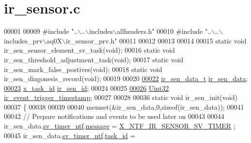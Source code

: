 \hypertarget{a00045_source}{\section{ir\+\_\+sensor.\+c}
\label{a00045_source}
}

\begin{DoxyCode}
00001 
00009 \textcolor{preprocessor}{#include "..\(\backslash\)..\(\backslash\)includes\(\backslash\)allheaders.h"} 
00010 \textcolor{preprocessor}{#include "..\(\backslash\)..\(\backslash\)includes\_prv\(\backslash\)aq0X\(\backslash\)ir\_sensor\_prv.h"}
00011 
00012 
00013 
00014 
00015 \textcolor{keyword}{static} \textcolor{keywordtype}{void}             ir\_sen\_sensor\_element\_sv\_task(\textcolor{keywordtype}{void});
00016 \textcolor{keyword}{static} \textcolor{keywordtype}{void}             ir\_sen\_threshold\_adjustment\_task(\textcolor{keywordtype}{void});
00017 \textcolor{keyword}{static} \textcolor{keywordtype}{void}             ir\_sen\_mark\_false\_postives(\textcolor{keywordtype}{void});
00018 \textcolor{keyword}{static} \textcolor{keywordtype}{void}             ir\_sen\_diagonesis\_record(\textcolor{keywordtype}{void});
00019 
00020 
\hypertarget{a00045_source_l00022}{}\hyperlink{a00045_a73dfacb46242746440accc76c7ef710d}{00022} \hyperlink{a00023_d6/d21/a00573}{ir\_sen\_data\_t} \hyperlink{a00045_a73dfacb46242746440accc76c7ef710d}{ir\_sen\_data};
\hypertarget{a00045_source_l00023}{}\hyperlink{a00045_a624782f67b3870f0dde83528770ef5fc}{00023} \hyperlink{a00036_ad5c3c5fbfd3e4aadf22830395484a71d}{x\_task\_id}        \hyperlink{a00045_a624782f67b3870f0dde83528770ef5fc}{ir\_sen\_id};
00024 
00025 
\hypertarget{a00045_source_l00026}{}\hyperlink{a00045_a6951f534a479b17c02d7da3ad6489634}{00026} \hyperlink{a00072_aba99025e657f892beb7ff31cecf64653}{Uint32}           \hyperlink{a00045_a6951f534a479b17c02d7da3ad6489634}{ir\_event\_trigger\_timestamp};
00027 
00028 
00036  \textcolor{keyword}{static} \textcolor{keywordtype}{void} ir\_sen\_init(\textcolor{keywordtype}{void})
00037 \{
00038 
00039 
00040     memset(&ir\_sen\_data,0,\textcolor{keyword}{sizeof}(ir\_sen\_data));
00041 
00042     \textcolor{comment}{// Prepare notifications and events to be used later on}
00043 
00044     ir\_sen\_data.\hyperlink{a00023_ada91b200053f2d93e3639dc4ee3415b4}{sv\_timer\_ntf}.\hyperlink{a00036_adf9665938515a20c283eea2c978cf80d}{message}                             = 
      \hyperlink{a00023_a3b0f15b601361fafa871c5e49df7842d}{X\_NTF\_IR\_SENSOR\_SV\_TIMER} ;
00045     ir\_sen\_data.\hyperlink{a00023_ada91b200053f2d93e3639dc4ee3415b4}{sv\_timer\_ntf}.\hyperlink{a00036_a21b41e494a28583d4da10f1afb1c5328}{task\_id}                          = 

\end{DoxyCode}
